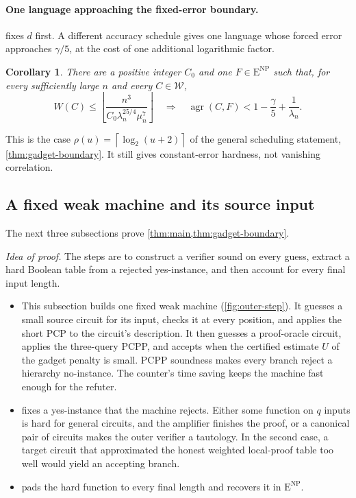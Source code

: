 \documentclass[11pt,letterpaper]{article}
\newtheorem{corollary}[theorem]{Corollary}
\theoremstyle{definition}
\theoremstyle{remark}
\newcommand{\ENP}{\mathrm{E}^{\mathrm{NP}}}
\newcommand{\ceil}[1]{\left\lceil #1\right\rceil}
\newcommand{\floor}[1]{\left\lfloor #1\right\rfloor}
\newcommand{\cW}{\mathcal W}
\newcommand{\lgx}{\log_2}
\begin{document}
\paragraph{One language approaching the fixed-error boundary.}
 fixes \(d\) first. A different accuracy schedule
gives one language whose forced error approaches \(\gamma/5\), at the
cost of one additional logarithmic factor.

\begin{corollary}\label{cor:main-boundary}
There are a positive integer \(C_0\) and one \(F\in\ENP\) such that,
for every sufficiently large \(n\) and every \(C\in\cW\),
\[
 W(C)\le\floor{\frac{n^3}{C_0\lambda_n^{25/4}\mu_n^7}}
 \quad\Longrightarrow\quad
 \operatorname{agr}(C,F)<1-\frac\gamma5+\frac1{\lambda_n}.
\]
\end{corollary}

This is the case \(\rho(u)=\ceil{\lgx(u+2)}\) of the general scheduling
statement, \cref{thm:gadget-boundary}. It still gives constant-error
hardness, not vanishing correlation.

\subsection{A fixed weak machine and its source input}
\label{sec:gadget-machine}

The next three subsections prove \cref{thm:main,thm:gadget-boundary}.

\emph{Idea of proof.} The steps are to construct a verifier sound on
every guess, extract a hard Boolean table from a rejected
yes-instance, and then account for every final input length.
\begin{itemize}
\item This subsection builds one fixed weak machine
(\cref{fig:outer-step}). It guesses a small source circuit for its
input, checks it at every position, and applies the short PCP to the
circuit's description. It then guesses a proof-oracle circuit, applies
the three-query PCPP, and accepts when the certified estimate \(U\) of
the gadget penalty is small. PCPP soundness makes every branch reject a
hierarchy no-instance. The counter's time saving keeps the machine fast
enough for the refuter.
\item {} fixes a yes-instance that the machine
rejects. Either some function on \(q\) inputs is hard for general
circuits, and the amplifier finishes the proof, or a canonical pair of
circuits makes the outer verifier a tautology. In the second case, a
target circuit that approximated the honest weighted local-proof table too
well would yield an accepting branch.
\item {} pads the hard function to every final
length and recovers it in \(\ENP\).
\end{itemize}
\end{document}
